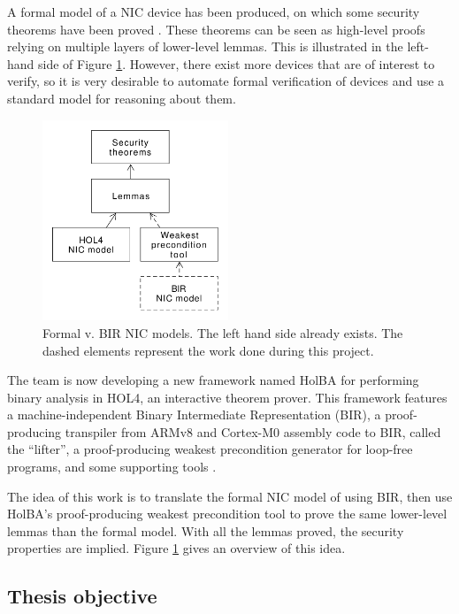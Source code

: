 \documentclass[10pt,a4paper]{article}
\begin{document}
\begin{multicols}{2}
A formal model of a {NIC} device has been produced, on which some security theorems have been proved \cite{haglund_formal_2016,haglund_trustworthy_nodate}. These theorems can be seen as high-level proofs relying on multiple layers of lower-level lemmas. This is illustrated in the left-hand side of Figure \ref{hol-v-bir-nic-model-simple}. However, there exist more devices that are of interest to verify, so it is very desirable to automate formal verification of devices and use a standard model for reasoning about them.
%
\begin{figure}[H]
  \centering
	\includegraphics[height=6cm]{figures/hol-v-bir-nic-model-simple.png}
	\caption{Formal v. BIR NIC models. The left hand side already exists. The dashed elements represent the work done during this project.}
	\label{hol-v-bir-nic-model-simple}
\end{figure}

The team is now developing a new framework named {HolBA} for performing binary analysis in HOL4, an interactive theorem prover. This framework features a machine-independent Binary Intermediate Representation (BIR), a proof-producing transpiler from ARMv8 and Cortex-M0 assembly code to BIR, called the ``lifter'', a proof-producing weakest precondition generator for loop-free programs, and some supporting tools \cite{metere_sound_2017,lindner_trabin:_2019}.

The idea of this work is to translate the formal {NIC} model of \cite{haglund_formal_2016} using {BIR}, then use HolBA's proof-producing weakest precondition tool to prove the same lower-level lemmas than the formal model. With all the lemmas proved, the security properties are implied. Figure \ref{hol-v-bir-nic-model-simple} gives an overview of this idea.

\subsection{Thesis objective}


\end{multicols}
\end{document}
